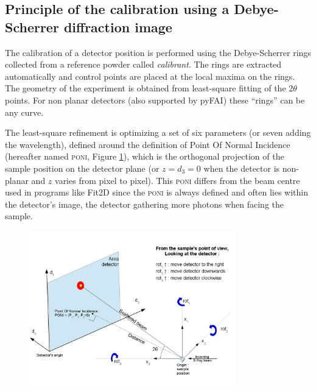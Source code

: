 \documentclass[preprint, pdf]{iucr}              %
\let\caption\foo
\begin{document}
\subsection{Principle of the calibration using a Debye-Scherrer diffraction
image}
The calibration of a detector position is performed using the Debye-Scherrer
rings collected from a reference powder called \textit{calibrant}.
The rings are extracted automatically and control points are placed at the
local maxima on the rings.
The geometry of the experiment is obtained from least-square fitting of
the $2\theta$ points.
For non planar detectors (also supported by pyFAI) these ``rings'' can
be any curve.

The least-square refinement is optimizing a set of six parameters
(or seven adding the wavelength), defined around the  definition of Point
Of Normal Incidence (hereafter named \textsc{poni}, Figure \ref{poni}), which is
the orthogonal projection  of the sample position on the detector plane (or
$z=d_3=0$ when the detector is non-planar and $z$ varies from pixel to pixel).
This \textsc{poni} differs from the beam centre used in programs like
Fit2D \cite{Hammersley:fs5107} since the \textsc{poni} is always defined and often lies
within the detector's image, the detector gathering more photons 
when facing the sample.

\begin{figure}
\label{poni}
\begin{center}
\includegraphics[width=9cm]{images/PONI.png}
\caption{Geometry used in pyFAI.}
\end{center}
\end{figure}
\end{document}
